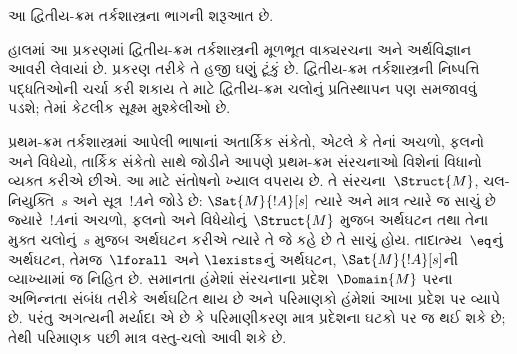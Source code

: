 
\label{guunit:OLP-0322}


\begin{editorial}
આ દ્વિતીય-ક્રમ તર્કશાસ્ત્રના ભાગની શરૂઆત છે.
\end{editorial}

\begingroup
\makeatletter{}\makeatother

\label{guunit:OLP-0323}


\begin{editorial}
હાલમાં આ પ્રકરણમાં દ્વિતીય-ક્રમ તર્કશાસ્ત્રની મૂળભૂત વાક્યરચના અને
અર્થવિજ્ઞાન આવરી લેવાયાં છે. પ્રકરણ તરીકે તે હજી ઘણું ટૂંકું છે.
દ્વિતીય-ક્રમ તર્કશાસ્ત્રની નિષ્પત્તિ પદ્ધતિઓની ચર્ચા કરી શકાય તે
માટે દ્વિતીય-ક્રમ ચલોનું પ્રતિસ્થાપન પણ સમજાવવું પડશે; તેમાં કેટલીક
સૂક્ષ્મ મુશ્કેલીઓ છે.
\end{editorial}

\begingroup
\makeatletter{}\makeatother


\label{guunit:OLP-0324}


પ્રથમ-ક્રમ તર્કશાસ્ત્રમાં આપેલી ભાષાનાં અતાર્કિક સંકેતો, એટલે કે તેનાં
અચળો, ફલનો અને વિધેયો, તાર્કિક સંકેતો સાથે
જોડીને આપણે પ્રથમ-ક્રમ સંરચનાઓ વિશેનાં વિધાનો વ્યક્ત કરીએ છીએ.
આ માટે સંતોષનો ખ્યાલ વપરાય છે. તે સંરચના~$\Struct{M}$,
ચલ-નિયુક્તિ~$s$ અને સૂત્ર~$!A$ને જોડે છે: $\Sat{M}{!A}[s]$
ત્યારે અને માત્ર ત્યારે જ સાચું છે જ્યારે~$!A$નાં અચળો,
ફલનો અને વિધેયોનું~$\Struct{M}$ મુજબ અર્થઘટન તથા
તેના મુક્ત ચલોનું~$s$ મુજબ અર્થઘટન કરીએ ત્યારે તે જે કહે છે તે
સાચું હોય. તાદાત્મ્ય~$\eq$નું અર્થઘટન, તેમજ~$\lforall$ અને
$\lexists$નું અર્થઘટન, $\Sat{M}{!A}[s]$ની વ્યાખ્યામાં જ નિહિત છે.
સમાનતા હંમેશાં સંરચનાના પ્રદેશ~$\Domain{M}$ પરના અભિન્નતા
સંબંધ તરીકે અર્થઘટિત થાય છે અને પરિમાણકો હંમેશાં આખા પ્રદેશ પર
વ્યાપે છે. પરંતુ અગત્યની મર્યાદા એ છે કે પરિમાણીકરણ માત્ર
પ્રદેશના ઘટકો પર જ થઈ શકે છે; તેથી પરિમાણક પછી માત્ર વસ્તુ-ચલો
આવી શકે છે.

